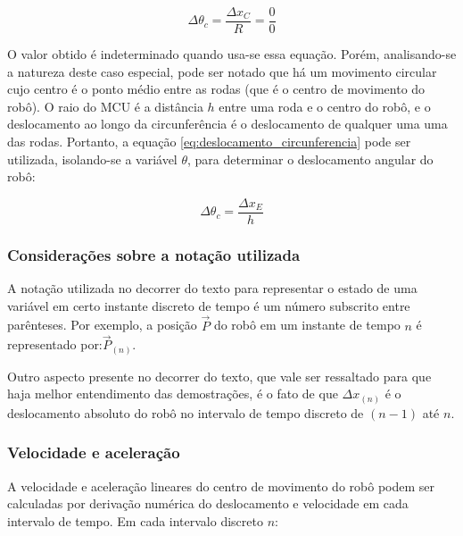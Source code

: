 \begin{equation}
  \Delta \theta_c = \frac{\Delta x_C}{R} = \frac{0}{0}
  \label{eq:caso_especial2_theta}
\end{equation}

O valor obtido é indeterminado quando usa-se essa equação. Porém, analisando-se a natureza deste caso especial, pode ser notado que há um movimento circular cujo centro é o ponto médio entre as rodas (que é o centro de movimento do robô). O raio do MCU é a distância $h$ entre uma roda e o centro do robô, e o deslocamento ao longo da circunferência é o deslocamento de qualquer uma uma das rodas. Portanto, a equação \ref{eq:deslocamento_circunferencia} pode ser utilizada, isolando-se a variável $\theta$, para determinar o deslocamento angular do robô:

\begin{equation}
  \Delta \theta_c = \frac{\Delta x_E}{h}
  \label{eq:caso_especial2_theta2}
\end{equation}

\subsubsection{Considerações sobre a notação utilizada}

A notação utilizada no decorrer do texto para representar o estado de uma variável em certo instante discreto de tempo é um número subscrito entre parênteses. Por exemplo, a posição $\overrightarrow{P}$ do robô em um instante de tempo $n$ é representado por:$\overrightarrow{P}_{(n)}$. 

Outro aspecto presente no decorrer do texto, que vale ser ressaltado para que haja melhor entendimento das demostrações, é o fato de que $\Delta x_{(n)}$ é o deslocamento absoluto do robô no intervalo de tempo discreto de $(n-1)$ até $n$.

%

\subsubsection{Velocidade e aceleração}

A velocidade e aceleração lineares do centro de movimento do robô podem ser calculadas por derivação numérica do deslocamento e velocidade em cada intervalo de tempo. Em cada intervalo discreto $n$:

